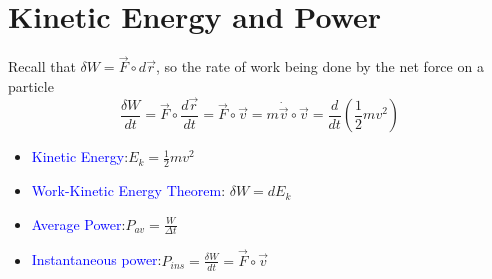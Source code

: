 \documentclass{beamer}
\begin{document}
\section{Kinetic Energy and Power}
\begin{frame}
  Recall that $\delta W = \vec{F}\circ d\vec{r}$, so the rate of work being done by the net force on a particle 
  $$
  \frac{\delta W}{dt} = \vec{F}\circ \frac{d\vec{r}}{dt}=\vec{F}\circ \vec{v} = m \dot{\vec{v}}\circ \vec{v}=\frac{d}{dt}(\frac{1}{2}mv^2) 
  $$
  \pause
  \begin{itemize}
    \item \textcolor{blue}{Kinetic Energy}:$E_k=\frac{1}{2}mv^2$
    \item \textcolor{blue}{Work-Kinetic Energy Theorem}: $\delta W = dE_k$\pause
    \item \textcolor{blue}{Average Power}:$P_{av}=\frac{W}{\Delta t}$
    \item \textcolor{blue}{Instantaneous power}:$P_{ins} = \frac{\delta W}{dt}=\vec{F}\circ \vec{v}$
  \end{itemize}
\end{frame}
\end{document}
